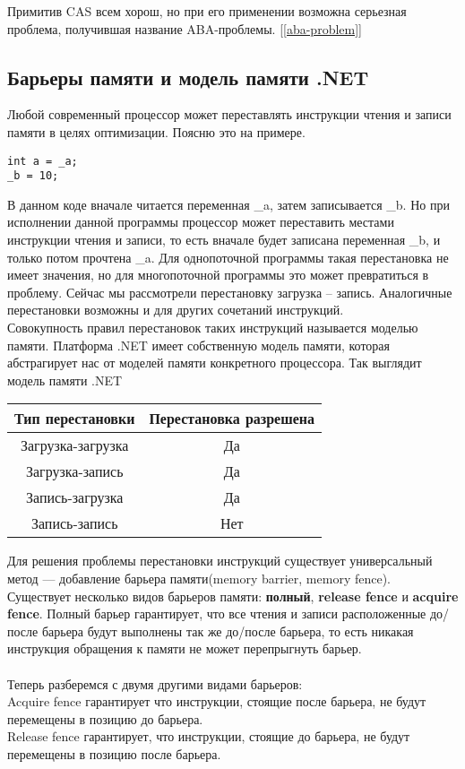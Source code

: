\documentclass{article}
\begin{document}
Примитив CAS всем хорош, но при его применении возможна серьезная проблема, получившая название ABA-проблемы. [\ref{aba-problem}]

\subsection{Барьеры памяти и модель памяти .NET}

Любой современный процессор может переставлять инструкции чтения и записи памяти в целях оптимизации. Поясню это на примере.

\begin{lstlisting}
int a = _a;
_b = 10;
\end{lstlisting}

В данном коде вначале читается переменная \_a, затем записывается \_b. Но при исполнении данной программы процессор может переставить местами инструкции чтения и записи, то есть вначале будет записана переменная \_b, и только потом прочтена \_a. Для однопоточной программы такая перестановка не имеет значения, но для многопоточной программы это может превратиться в проблему. Сейчас мы рассмотрели перестановку загрузка – запись. Аналогичные перестановки возможны и для других сочетаний инструкций.\\

Совокупность правил перестановок таких инструкций называется моделью памяти. Платформа .NET имеет собственную модель памяти, которая абстрагирует нас от моделей памяти конкретного процессора. 
Так выглядит модель памяти .NET \\

\begin{tabular}{ | c | c | }
\hline
Тип перестановки & Перестановка разрешена \\
\hline
Загрузка-загрузка & Да \\
Загрузка-запись & Да \\
Запись-загрузка & Да \\
Запись-запись & Нет \\
\hline
\end{tabular}

Для решения проблемы перестановки инструкций существует универсальный метод — добавление барьера памяти(memory barrier, memory fence). \\

Существует несколько видов барьеров памяти: \textbf{полный}, \textbf{release fence} и \textbf{acquire fence}. Полный барьер гарантирует, что все чтения и записи расположенные до/после барьера будут выполнены так же до/после барьера, то есть никакая инструкция обращения к памяти не может перепрыгнуть барьер. \\ \\
Теперь разберемся с двумя другими видами барьеров:\\
Acquire fence гарантирует что инструкции, стоящие после барьера, не будут перемещены в позицию до барьера.\\
Release fence гарантирует, что инструкции, стоящие до барьера, не будут перемещены в позицию после барьера.\\
\end{document}

